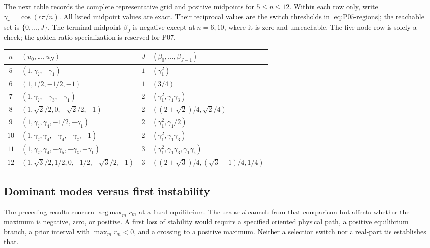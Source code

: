 \documentclass[11pt]{article}
\DeclareMathOperator*{\argmax}{arg\,max}
\theoremstyle{definition}
\theoremstyle{remark}
\begin{document}
The next table records the complete representative grid and positive
midpoints for $5\le n\le12$. Within each row only, write
$\gamma_r=\cos(r\pi/n)$. All listed midpoint values are exact.
Their reciprocal values are the switch thresholds in
\eqref{eq:P05-regions}; the reachable set is $\{0,\ldots,J\}$.
The terminal midpoint $\beta_J$ is negative except at $n=6,10$,
where it is zero and unreachable. The five-node row is solely a check;
the golden-ratio specialization is reserved for P07.
\begin{center}
\small
\renewcommand{\arraystretch}{1.3}
\begin{tabular}{@{}c l c l@{}}
\toprule
$n$ & $(u_0,\ldots,u_N)$ & $J$ & $(\beta_0,\ldots,\beta_{J-1})$\\
\midrule
$5$ & $(1,\gamma_2,-\gamma_1)$ & $1$ & $(\gamma_1^2)$\\
$6$ & $(1,1/2,-1/2,-1)$ & $1$ & $(3/4)$\\
$7$ & $(1,\gamma_2,-\gamma_3,-\gamma_1)$ & $2$ & $(\gamma_1^2,\gamma_1\gamma_3)$\\
$8$ & $(1,\sqrt2/2,0,-\sqrt2/2,-1)$ & $2$ & $((2+\sqrt2)/4,\sqrt2/4)$\\
$9$ & $(1,\gamma_2,\gamma_4,-1/2,-\gamma_1)$ & $2$ & $(\gamma_1^2,\gamma_1/2)$\\
$10$ & $(1,\gamma_2,\gamma_4,-\gamma_4,-\gamma_2,-1)$ & $2$ & $(\gamma_1^2,\gamma_1\gamma_3)$\\
$11$ & $(1,\gamma_2,\gamma_4,-\gamma_5,-\gamma_3,-\gamma_1)$ & $3$ & $(\gamma_1^2,\gamma_1\gamma_3,\gamma_1\gamma_5)$\\
$12$ & $(1,\sqrt3/2,1/2,0,-1/2,-\sqrt3/2,-1)$ & $3$ & $((2+\sqrt3)/4,(\sqrt3+1)/4,1/4)$\\
\bottomrule
\end{tabular}
\end{center}

\subsection{Dominant modes versus first instability}

The preceding results concern $\argmax_m r_m$ at a fixed equilibrium.
The scalar $d$ cancels from that comparison but affects whether the
maximum is negative, zero, or positive. A first loss of stability would
require a specified oriented physical path, a positive equilibrium branch,
a prior interval with $\max_m r_m<0$, and a crossing to a positive
maximum. Neither a selection switch nor a real-part tie establishes that.
\end{document}
